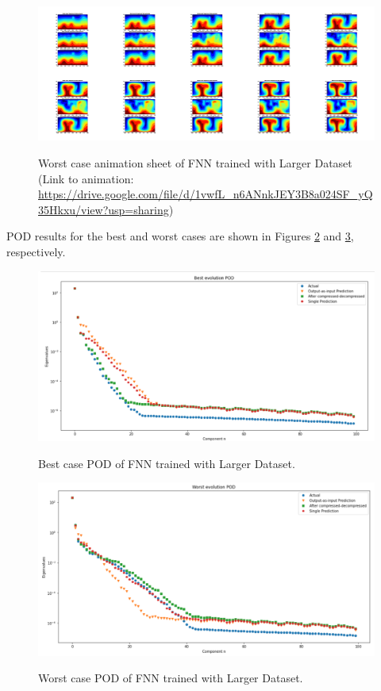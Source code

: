 \begin{figure}[H]
    \centering
    \caption{Worst case animation sheet of FNN trained with Larger Dataset (Link to animation: 
    \url{https://drive.google.com/file/d/1vwfL_n6ANnkJEY3B8a024SF_yQ35Hkxu/view?usp=sharing})}
    \includegraphics[scale=0.10]{figures/mantle_convection_images/larger_dataset/FNN_Worst_GIF_sheet.png}
    \label{figure:FNN_larger_worst_gif}
\end{figure}

POD results for the best and worst cases are shown in Figures \ref{figure:FNN_larger_best_POD} and \ref{figure:FNN_larger_worst_POD}, respectively.

\begin{figure}[H]
    \caption{Best case POD of FNN trained with Larger Dataset.}
    \includegraphics[scale=0.5]{figures/mantle_convection_images/larger_dataset/FNN_Best_POD.png}
    \label{figure:FNN_larger_best_POD}
\end{figure}

\begin{figure}[H]
    \caption{Worst case POD of FNN trained with Larger Dataset.}
    \includegraphics[scale=0.5]{figures/mantle_convection_images/larger_dataset/FNN_Worst_POD.png}
    \label{figure:FNN_larger_worst_POD}
\end{figure}

